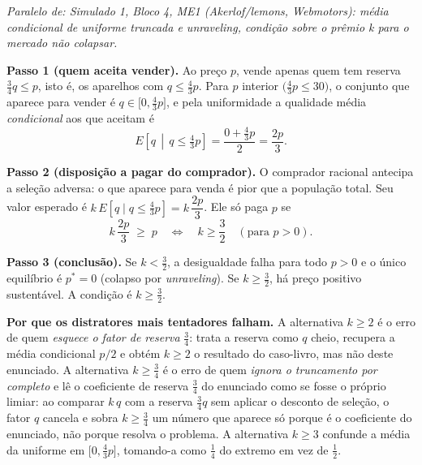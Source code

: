 \begin{solucao}
{\footnotesize\textit{Paralelo de: Simulado 1, Bloco 4, ME1 (Akerlof/lemons, Webmotors): média condicional de uniforme truncada e unraveling, condição sobre o prêmio k para o mercado não colapsar.}}\par\vspace{0.2em}
\textbf{Passo 1 (quem aceita vender).} Ao pre\c{c}o $p$, vende apenas quem tem reserva $\tfrac{3}{4}q \le p$, isto \'e, os aparelhos com $q \le \tfrac{4}{3}p$. Para $p$ interior $\big(\tfrac{4}{3}p \le 30\big)$, o conjunto que aparece para vender \'e $q \in \big[0,\tfrac{4}{3}p\big]$, e pela uniformidade a qualidade m\'edia \emph{condicional} aos que aceitam \'e
\[
E\!\left[q \,\middle|\, q \le \tfrac{4}{3}p\right] = \frac{0 + \tfrac{4}{3}p}{2} = \frac{2p}{3}.
\]

\textbf{Passo 2 (disposi\c{c}\~ao a pagar do comprador).} O comprador racional antecipa a sele\c{c}\~ao adversa: o que aparece para venda \'e pior que a popula\c{c}\~ao total. Seu valor esperado \'e $k\,E\!\left[q \mid q \le \tfrac{4}{3}p\right] = k\,\dfrac{2p}{3}$. Ele s\'o paga $p$ se
\[
k\,\frac{2p}{3} \;\ge\; p \quad\Longleftrightarrow\quad k \ge \frac{3}{2}\quad(\text{para } p>0).
\]

\textbf{Passo 3 (conclus\~ao).} Se $k < \tfrac{3}{2}$, a desigualdade falha para todo $p>0$ e o \'unico equil\'ibrio \'e $p^{*}=0$ (colapso por \emph{unraveling}). Se $k \ge \tfrac{3}{2}$, h\'a pre\c{c}o positivo sustent\'avel. A condi\c{c}\~ao \'e $k \ge \tfrac{3}{2}$.

\textbf{Por que os distratores mais tentadores falham.} A alternativa $k \ge 2$ \'e o erro de quem \emph{esquece o fator de reserva} $\tfrac{3}{4}$: trata a reserva como $q$ cheio, recupera a m\'edia condicional $p/2$ e obt\'em $k \ge 2$ \textemdash{} o resultado do caso-livro, mas n\~ao deste enunciado. A alternativa $k \ge \tfrac{3}{4}$ \'e o erro de quem \emph{ignora o truncamento por completo} e l\^e o coeficiente de reserva $\tfrac{3}{4}$ do enunciado como se fosse o pr\'oprio limiar: ao comparar $k\,q$ com a reserva $\tfrac{3}{4}q$ sem aplicar o desconto de sele\c{c}\~ao, o fator $q$ cancela e sobra $k \ge \tfrac{3}{4}$ \textemdash{} um n\'umero que aparece s\'o porque \'e o coeficiente do enunciado, n\~ao porque resolva o problema. A alternativa $k \ge 3$ confunde a m\'edia da uniforme em $\big[0,\tfrac{4}{3}p\big]$, tomando-a como $\tfrac{1}{4}$ do extremo em vez de $\tfrac{1}{2}$.


\end{solucao}

